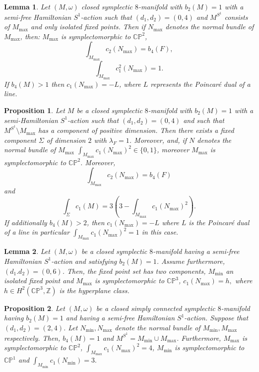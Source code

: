 \documentclass[10pt,a4paper]{amsart}
\newtheorem{proposition}{Proposition}
\newtheorem{lemma}{Lemma}
\begin{document}
\begin{lemma} \label{zerofourcaseone}
Let $(M,\omega)$  closed symplectic $8$-manifold with $b_{2}(M)=1$ with a semi-free Hamiltonian $S^1$-action such that $(d_1,d_2)=(0,4)$ and $M^{S^1}$ consists of $M_{\max}$ and only isolated fixed points. Then if $N_{\max}$ denotes the normal bundle of $M_{\max}$, then: $M_{\max}$ is symplectomorphic to $\mathbb{CP}^2$, $$\int_{M_{\max}}c_{2}(N_{\max}) = b_{4}(F),$$ $$  \int_{M_{\max}} c_{1}^2(N_{\max})  = 1. $$ If $b_{4}(M)>1$ then $c_{1}(N_{\max})=-L$, where $L$ represents the Poincar\'{e} dual of a line. 
\end{lemma}

\begin{proposition} \label{zerofourcasetwo}
Let $M$ be a closed symplectic $8$-manifold with $b_{2}(M)=1$ with a semi-Hamiltonian $S^1$-action  such that $(d_1,d_2)=(0,4)$ and such that $M^{S^1} \setminus M_{\max}$ has a component of positive dimension. Then there exists a fixed component $\Sigma$ of dimension $2$ with $\lambda_{F}=1$. Moreover, and, if $N$ denotes the normal bundle of $M_{\max}$ $\int_{M_{\max}} c_{1}(N_{\max})^2 \in \{0,1\}$, moreover $M_{\max}$ is symplectomorphic to $\mathbb{CP}^2$. Moreover, $$\int_{M_{\max}}c_{2}(N_{\max}) = b_{4}(F)$$ and  $$\int_{\Sigma} c_{1}(M)  = 3(3- \int_{M_{\max}} c_{1}(N_{\max})^2).$$If additionally  $b_{4}(M) > 2$, then $c_{1}(N_{\max})=-L$ where $L$ is the Poincar\'{e} dual of a line in particular $\int_{M_{\max}} c_{1}(N_{\max})^2 =1$ in this case.
\end{proposition}

\begin{lemma} \label{zerosixcase}
Let $(M,\omega)$ be a closed symplectic $8$-manifold having a semi-free Hamiltonian $S^1$-action and satisfying $b_{2}(M)=1$. Assume furthermore, $(d_1.d_{2}) = (0,6)$. Then, the fixed point set has two components, $M_{\min}$ an isolated fixed point and $M_{\max}$ is symplectomorphic to $\mathbb{CP}^3$, $c_{1}(N_{\max}) = h,$ where $h \in H^{2}(\mathbb{CP}^3,\mathbb{Z})$ is the hyperplane class.
\end{lemma}

\begin{proposition} \label{twofourcase}
Let $(M,\omega)$ be a closed simply connected symplectic $8$-manifold having $b_{2}(M)=1$ and having a semi-free Hamiltonian $S^1$-action. Suppose that $(d_1,d_2) = (2,4)$. Let $N_{\min},N_{\max}$ denote the normal bundle of $M_{\min},M_{\max}$ respectively.  Then, $b_{4}(M)=1$ and $M^{S^1}=M_{\min} \cup M_{\max}$. Furthermore, $M_{\max}$ is symplectomorphic to $\mathbb{CP}^2$, $\int_{M_{\max}} c_{1}(N_{\max})^2 = 4$, $M_{\min}$ is symplectomorphic to $\mathbb{CP}^1$ and $\int_{M_{\min}} c_{1}(N_{\min}) = 3.$ 

\end{proposition}
\end{document}
